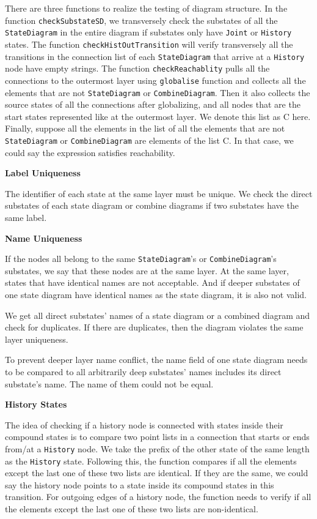 There are three functions to realize the testing of diagram structure.
In the function \verb|checkSubstateSD|, we transversely check the substates of all the \verb|StateDiagram| in the entire diagram if substates only have \verb|Joint| or \verb|History| states.
The function \verb|checkHistOutTransition| will verify transversely all the transitions in the connection list of each \verb|StateDiagram| that arrive at a \verb|History| node have empty strings.
The function \verb|checkReachablity| pulls all the connections to the outermost layer using \verb|globalise| function and collects all the elements that are not \verb|StateDiagram| or \verb|CombineDiagram|.
Then it also collects the source states of all the connections after globalizing, and all nodes that are the start states represented like at the outermost layer. We denote this list as C here.
Finally, suppose all the elements in the list of all the elements that are not \verb|StateDiagram| or \verb|CombineDiagram| are elements of the list C. In that case, we could say the expression satisfies reachability.

\textbf{Label Uniqueness}

The identifier of each state at the same layer must be unique.
We check the direct substates of each state diagram or combine diagrams if two substates have the same label.

\textbf{Name Uniqueness}

If the nodes all belong to the same \verb |StateDiagram|'s or \verb |CombineDiagram|'s substates, we say that these nodes are at the same layer.
At the same layer, states that have identical names are not acceptable.
And if deeper substates of one state diagram have identical names as the state diagram, it is also not valid.

We get all direct substates' names of a state diagram or a combined diagram and check for duplicates.
If there are duplicates, then the diagram violates the same layer uniqueness.

To prevent deeper layer name conflict, the name field of one state diagram needs to be compared to all arbitrarily deep substates' names includes its direct substate's name.
The name of them could not be equal.

\textbf{History States} 

The idea of checking if a history node is connected with states inside their compound states is to compare two point lists in a connection that starts or ends from/at a \verb |History| node.
We take the prefix of the other state of the same length as the \verb |History| state. 
Following this, the function compares if all the elements except the last one of these two lists are identical. 
If they are the same, we could say the history node points to a state inside its compound states in this transition.
For outgoing edges of a history node, the function needs to verify if all the elements except the last one of these two lists are non-identical.


